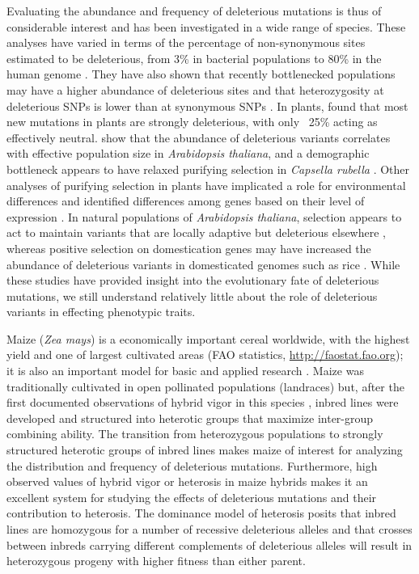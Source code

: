 \documentclass[12pt]{article}
\begin{document}
Evaluating the abundance and frequency of deleterious mutations is thus of considerable interest and has been investigated in a wide range of species. These analyses have varied in terms of the percentage of non-synonymous sites estimated to be deleterious, from 3\% in bacterial populations \citep{Hughes2005} to 80\% in the human genome \citep{Fay2001}. They have also shown that recently bottlenecked populations may have a higher abundance of deleterious sites and that heterozygosity at deleterious SNPs is lower than at synonymous SNPs \citep{Lohmueller2008}.
In plants, \citet{Gossmann2010} found that most new mutations in plants are strongly deleterious, with only ~25\% acting as effectively neutral. \citet{Cao2011} show that the abundance of deleterious variants correlates with effective population size in \emph{Arabidopsis thaliana}, and a demographic bottleneck  appears to have relaxed purifying selection in \emph{Capsella rubella} \citep{Brandvain2013}. Other analyses of purifying selection in plants have implicated a role for environmental differences \citep{Tellier2011} and identified differences among genes based on their level of expression \citep{Paape2013}. In natural populations of \emph{Arabidopsis thaliana}, selection appears to act to maintain variants that are locally adaptive but deleterious elsewhere \citep{Fournier-Level2011}, whereas positive selection on domestication genes may have increased the abundance of deleterious variants in domesticated genomes such as rice \citep{Gunther2010, Lu2006}. While these studies have provided insight into the evolutionary fate of deleterious mutations, we still understand relatively little about the role of deleterious variants in effecting phenotypic traits. 

Maize (\emph{Zea mays}) is a  economically important cereal worldwide, with the highest yield and one of largest cultivated areas (FAO statistics, \url{http://faostat.fao.org}); it is also an important model for basic and applied research \citep{Strable2009}. Maize was traditionally cultivated in open pollinated populations (landraces) but, after the first documented observations of hybrid vigor in this species \citep{East1908,Shull1908}, inbred lines were developed and structured into heterotic groups that maximize inter-group combining ability. 
The transition from heterozygous populations to strongly structured heterotic groups of inbred lines makes maize of interest for analyzing the distribution and frequency of deleterious mutations. Furthermore, high observed values of hybrid vigor or heterosis in maize hybrids makes it an excellent system for studying the effects of deleterious mutations and their contribution to heterosis.  The dominance model of heterosis posits that inbred lines are homozygous for a number of recessive deleterious alleles and that crosses between inbreds carrying different complements of deleterious alleles will result in heterozygous progeny with higher fitness than either parent.
\end{document}
